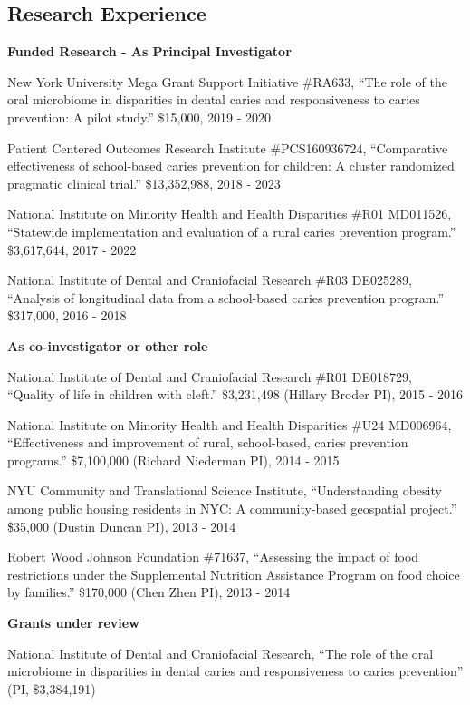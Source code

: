 \documentclass[margin,line]{res}
\begin{document}
\begin{resume}
\section{\sc Research Experience}
{\bf Funded Research - As Principal Investigator} \hfill 

\vspace*{-2.5mm}
New York University Mega Grant Support Initiative \#RA633, “The role of the oral microbiome in disparities in dental caries and responsiveness to caries prevention: A pilot study.” \$15,000, 2019 - 2020

Patient Centered Outcomes Research Institute \#PCS160936724, “Comparative effectiveness of school-based caries prevention for children: A cluster randomized pragmatic clinical trial.” \$13,352,988, 2018 - 2023

National Institute on Minority Health and Health Disparities \#R01 MD011526, “Statewide implementation and evaluation of a rural caries prevention program.” \$3,617,644, 2017 - 2022

National Institute of Dental and Craniofacial Research \#R03 DE025289, “Analysis of longitudinal data from a school-based caries prevention program.” \$317,000, 2016 - 2018

{\bf As co-investigator or other role} \hfill 

\vspace*{-2.5mm}
National Institute of Dental and Craniofacial Research \#R01 DE018729, “Quality of life in children with cleft.” \$3,231,498 (Hillary Broder PI), 2015 - 2016	

National Institute on Minority Health and Health Disparities \#U24 MD006964, “Effectiveness and improvement of rural, school-based, caries prevention programs.” \$7,100,000 (Richard Niederman PI), 2014 - 2015	

NYU Community and Translational Science Institute, “Understanding obesity among public housing residents in NYC: A community-based geospatial project.” \$35,000 (Dustin Duncan PI), 2013 - 2014

Robert Wood Johnson Foundation \#71637, “Assessing the impact of food restrictions under the Supplemental Nutrition Assistance Program on food choice by families.” \$170,000 (Chen Zhen PI), 2013 - 2014

{\bf Grants under review} \hfill 

\vspace*{-2.5mm}
National Institute of Dental and Craniofacial Research, “The role of the oral microbiome in disparities in dental caries and responsiveness to caries prevention” (PI, \$3,384,191)


\end{resume}
\end{document}
